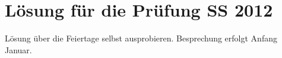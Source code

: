 

\section{Lösung für die Prüfung SS 2012}

Lösung über die Feiertage selbst ausprobieren. Besprechung erfolgt Anfang Januar.